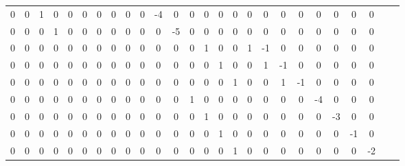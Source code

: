 \begin{tabular}{cccccccccccccccccccccccccc}
       0  &       0  &       1  &       0  &       0  &       0  &       0  &       0  &       0  &       0  &     -4  &       0  &       0  &       0  &       0  &       0  &       0  &       0  &       0  &       0  &       0  &       0  &       0  &       0 \\
       0  &       0  &       0  &       1  &       0  &       0  &       0  &       0  &       0  &       0  &       0  &     -5  &       0  &       0  &       0  &       0  &       0  &       0  &       0  &       0  &       0  &       0  &       0  &       0 \\
       0  &       0  &       0  &       0  &       0  &       0  &       0  &       0  &       0  &       0  &       0  &       0  &       0  &       1  &       0  &       0  &       1  &     -1  &       0  &       0  &       0  &       0  &       0  &       0 \\
       0  &       0  &       0  &       0  &       0  &       0  &       0  &       0  &       0  &       0  &       0  &       0  &       0  &       0  &       1  &       0  &       0  &       1  &     -1  &       0  &       0  &       0  &       0  &       0 \\
       0  &       0  &       0  &       0  &       0  &       0  &       0  &       0  &       0  &       0  &       0  &       0  &       0  &       0  &       0  &       1  &       0  &       0  &       1  &     -1  &       0  &       0  &       0  &       0 \\
       0  &       0  &       0  &       0  &       0  &       0  &       0  &       0  &       0  &       0  &       0  &       0  &       1  &       0  &       0  &       0  &       0  &       0  &       0  &       0  &     -4  &       0  &       0  &       0 \\
       0  &       0  &       0  &       0  &       0  &       0  &       0  &       0  &       0  &       0  &       0  &       0  &       0  &       1  &       0  &       0  &       0  &       0  &       0  &       0  &       0  &     -3  &       0  &       0 \\
       0  &       0  &       0  &       0  &       0  &       0  &       0  &       0  &       0  &       0  &       0  &       0  &       0  &       0  &       1  &       0  &       0  &       0  &       0  &       0  &       0  &       0  &     -1  &       0 \\
       0  &       0  &       0  &       0  &       0  &       0  &       0  &       0  &       0  &       0  &       0  &       0  &       0  &       0  &       0  &       1  &       0  &       0  &       0  &       0  &       0  &       0  &       0  &     -2 
\end{tabular}



